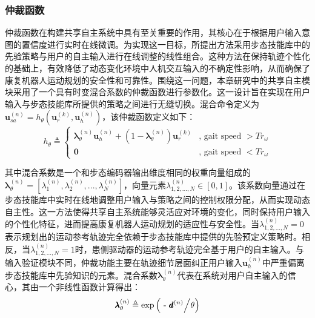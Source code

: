 \subsubsection{仲裁函数}仲裁函数在构建共享自主系统中具有至关重要的作用，其核心在于根据用户输入意图的置信度进行实时在线微调。为实现这一目标，所提出方法采用步态技能库中的先验策略与用户的自主输入进行在线调整的线性组合。这种方法在保持轨迹个性化的基础上，有效降低了动态变化环境中人机交互输入的不确定性影响，从而确保了康复机器人运动规划的安全性和可靠性。围绕这一问题，本章研究中的共享自主模块采用了一个具有时变混合系数的仲裁函数进行参数化。这一设计旨在实现在用户输入与步态技能库所提供的策略之间进行无缝切换。混合命令定义为${\pmb{u}}_{sa}^{(n)} = {h_\theta }({\pmb{u}}_r^{(k)},{\pmb{u}}_h^{(n)})$，该仲裁函数定义如下：
\begin{equation}
  \label{deqn_ex15}
  {h _\theta } \triangleq \left \{  {\begin{array}{*{20}{c}}
    {\pmb{\lambda }_\theta ^{(n)}{\pmb{u}}_h^{(n)} + \left( {1 - {\boldsymbol{\lambda }}_\theta ^{(n)}} \right){\pmb{u}}_r^{(k)}}&{{\text{, gait speed }}\pmb{ >  }T{r_\omega }}  \\  
    \pmb{0}&{{\text{, gait speed }}\pmb{ <  }T{r_\omega }} 
  \end{array}} \right.
\end{equation}

其中混合系数是一个和步态编码器输出维度相同的权重向量组成的${\pmb{\lambda }}_\theta ^{(n)} = [\lambda _1^{(n)},\lambda _2^{(n)},...,\lambda _N^{(n)}]$，向量元素$\lambda _{1,2,...,N}^{(n)} \in [0,1]$。该系数向量通过在步态技能库中实时在线地调整用户输入与策略之间的控制权限分配，从而实现动态自主性。这一方法使得共享自主系统能够灵活应对环境的变化，同时保持用户输入的个性化特征，进而提高康复机器人运动规划的适应性与安全性。当$\lambda _{1,2,...,N}^{(n)} = 0$表示规划出的运动参考轨迹完全依赖于步态技能库中提供的先验预定义策略时。相反，当$\lambda _{1,2,...,N}^{(n)} = 1$时，患侧驱动器的运动参考轨迹完全基于用户的自主输入。与输入验证模块不同，仲裁功能主要在轨迹细节层面纠正用户输入${\pmb{u}}_h^{(n)}$中严重偏离步态技能库中先验知识的元素。混合系数${\pmb{\lambda }}_\theta ^{(n)}$代表在系统对用户自主输入的信心，其由一个非线性函数计算得出：
\begin{equation}
  \label{deqn_ex16}
  {\pmb{\lambda }}_\theta ^{(n)} \triangleq {\text{exp}}\left( {{\text{ - }}{{{\pmb{d}^{(n)}}} \mathord{\left/
 {\vphantom {{{\pmb{d}^{(n)}}} \theta }} \right.
 \kern-\nulldelimiterspace} \theta }} \right)
\end{equation} 

